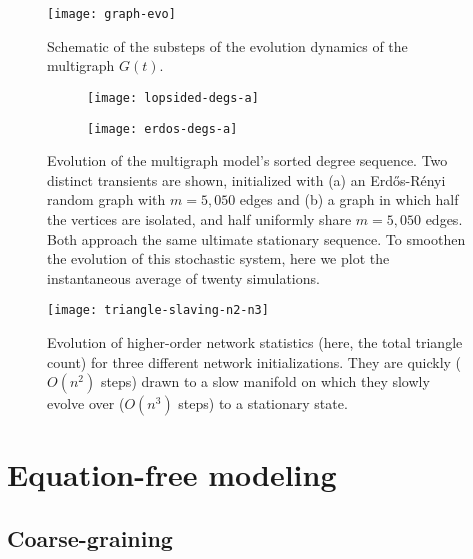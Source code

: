   \begin{figure}
    \centering
    \texttt{[image: graph-evo]}
    \caption[Schematic of the substeps involved in the multigraph
    evolution dynamics]{Schematic of the substeps of the evolution
      dynamics of the multigraph
      $G(t)$. \label{fig:step-illustration}}
  \end{figure}

  \begin{figure}
    \vspace{-5mm} \centering
    \begin{subfigure}[t]{0.49\textwidth}
      \centering
      \texttt{[image: lopsided-degs-a]}
      \subcaption{\label{fig:lopsided-init}}
    \end{subfigure} %
    \begin{subfigure}[t]{0.49\textwidth}
      \centering
      \texttt{[image: erdos-degs-a]}
      \subcaption{\label{fig:erdos-init}}
    \end{subfigure}
    \caption[Evolution of the multigraph model's sorted degree
    sequence]{Evolution of the multigraph model's sorted degree
      sequence. Two distinct transients are shown, initialized with
      (a) an Erd\H{o}s-R\'{e}nyi random graph with $m = 5,050$ edges
      and (b) a graph in which half the vertices are isolated, and
      half uniformly share $m = 5,050$ edges. Both approach the same
      ultimate stationary sequence. To smoothen the evolution of this
      stochastic system, here we plot the instantaneous average of
      twenty simulations. \label{fig:dse}}
  \end{figure}

  \begin{figure}
    \centering
    \texttt{[image: triangle-slaving-n2-n3]}
    \caption[Evolution of triangle count]{Evolution of higher-order
      network statistics (here, the total triangle count) for three
      different network initializations. They are quickly ($O(n^2)$
      steps) drawn to a slow manifold on which they slowly evolve over
      ($O(n^3)$ steps) to a stationary state. \label{fig:sv}}
  \end{figure}

  \section{Equation-free modeling\label{sec:ef}}

  \subsection{Coarse-graining}

